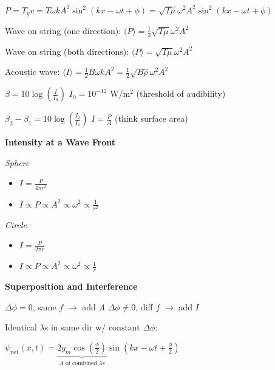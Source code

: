 \documentclass[twocolumn]{article}
\begin{document}
$P = T_y v = T \omega k A^2 \sin^2(kx - \omega t + \phi) = \sqrt{T \mu} \omega^2 A^2 \sin^2(kx - \omega t + \phi)$

Wave on string (one direction): $\langle P \rangle = \frac{1}{2} \sqrt{T \mu} \omega^2 A^2$

Wave on string (both directions): $\langle P \rangle = \sqrt{T \mu} \omega^2 A^2$

Acoustic wave: $\langle I \rangle = \frac{1}{2} B \omega k A^2 = \frac{1}{2} \sqrt{B \rho} \omega^2 A^2$

$\beta = 10 \log \left( \frac{I}{I_0} \right)$ \hfill $I_0 = 10^{-12}$ W/m$^2$ (threshold of audibility)

$\beta_2 - \beta_1 = 10 \log \left( \frac{I_2}{I_1} \right)$ \hfill $I = \frac{P}{A}$ (think surface area)


\newpage


\textbf{Intensity at a Wave Front} \vspace{-1em}
\begin{multicols}{2}
    \textit{Sphere} \vspace{-1em}
    \begin{itemize}
        \item $I = \frac{P}{4 \pi r^2}$
        \item $I \propto P \propto A^2 \propto \omega^2 \propto \frac{1}{r^2}$
    \end{itemize}

    \textit{Circle} \vspace{-1em}
    \begin{itemize}
        \item $I = \frac{P}{2 \pi r}$
        \item $I \propto P \propto A^2 \propto \omega^2 \propto \frac{1}{r}$
    \end{itemize}
\end{multicols} \vspace{-1.5em}


\dotfill


\textbf{Superposition and Interference}

$\Delta \phi = 0$, same $f$ $\rightarrow$ add $A$ \hfill $\Delta \phi \neq 0$, diff $f$ $\rightarrow$ add $I$

Identical $\lambda$s in same dir w/ constant $\Delta \phi$: \vspace{-1em}
\begin{center}
    $\psi_{\text{net}} (x, t) = \underbrace{2 y_m \cos \left( \frac{\phi}{2} \right)}_{\text{$A$ of combined $\lambda$s}} \sin \left( kx - \omega t + \frac{\phi}{2} \right)$
\end{center} \vspace{-.5em}
\end{document}
